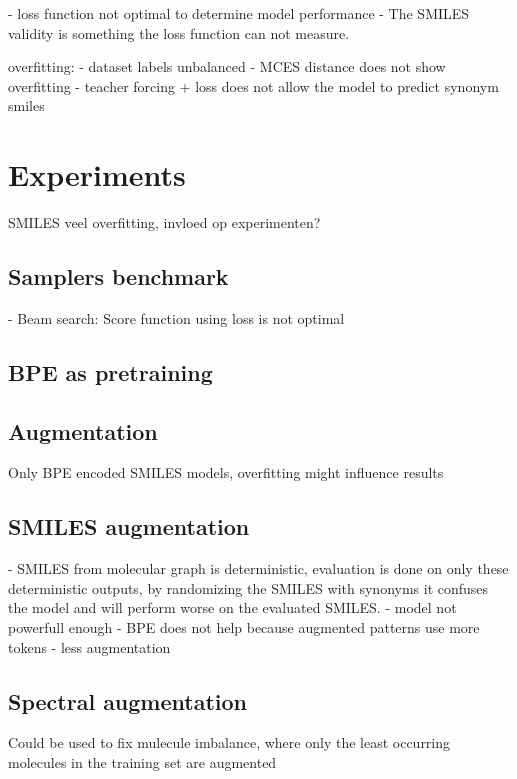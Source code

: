 - loss function not optimal to determine model performance
- The SMILES validity is something the loss function can not measure.

overfitting:
    - dataset labels unbalanced
    - MCES distance does not show overfitting
    - teacher forcing + loss does not allow the model to predict synonym smiles




\section{Experiments}

SMILES veel overfitting, invloed op experimenten?

\subsection{Samplers benchmark}

- Beam search: Score function using loss is not optimal
\subsection{\ac{BPE} as pretraining}


\subsection{Augmentation}
Only BPE encoded SMILES models, overfitting might influence results

\subsection{SMILES augmentation}
- SMILES from molecular graph is deterministic, evaluation is done on only these deterministic outputs, by randomizing the SMILES with synonyms it confuses the model and will perform worse on the evaluated SMILES.
- model not powerfull enough
- BPE does not help because augmented patterns use more tokens
- less augmentation

\subsection{Spectral augmentation}

Could be used to fix mulecule imbalance, where only the least occurring molecules in the training set are augmented


